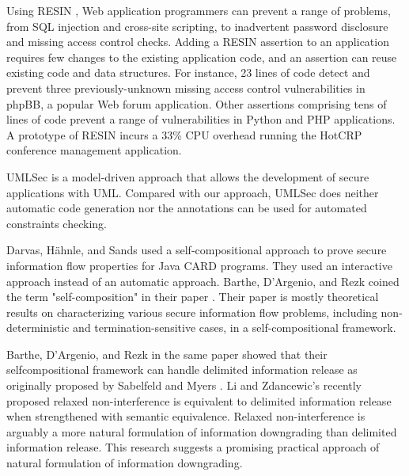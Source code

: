 Using RESIN \cite{ref_63_yip2009improving}, Web application programmers can prevent a range
of problems, from SQL injection and cross-site scripting, to inadvertent password disclosure and missing access control checks. Adding
a RESIN assertion to an application requires few changes to the
existing application code, and an assertion can reuse existing code
and data structures. For instance, 23 lines of code detect and prevent
three previously-unknown missing access control vulnerabilities in
phpBB, a popular Web forum application. Other assertions comprising tens of lines of code prevent a range of vulnerabilities in Python
and PHP applications. A prototype of RESIN incurs a 33\% CPU
overhead running the HotCRP conference management application.

UMLSec \cite{ref_33_juerjens:secure} is a model-driven approach that allows the
development of secure applications with UML. Compared with
our approach, UMLSec does neither automatic code
generation nor the annotations can be used for automated
constraints checking.

Darvas, H{\"a}hnle, and Sands \cite{ref_70_darvas2005theorem} used a self-compositional approach to prove secure information flow properties for Java CARD programs. They used an interactive approach instead of an automatic approach. Barthe, D'Argenio, and Rezk coined the term "self-composition" in their paper \cite{ref_71_barthe2004secure}. Their paper is mostly theoretical results on characterizing various secure information flow problems, including
non-deterministic and termination-sensitive cases, in a self-compositional framework.

Barthe, D'Argenio, and Rezk in the same paper showed that their selfcompositional framework can handle delimited information release as originally proposed by Sabelfeld and Myers \cite{ref_72_sabelfeld2004model}. Li and Zdancewic's
recently proposed relaxed non-interference \cite{ref_73_li2005downgrading} is equivalent to delimited information release when strengthened with semantic equivalence. Relaxed non-interference is arguably a more natural formulation of information downgrading than delimited
information release. This research suggests a promising practical approach of natural formulation of information downgrading.


